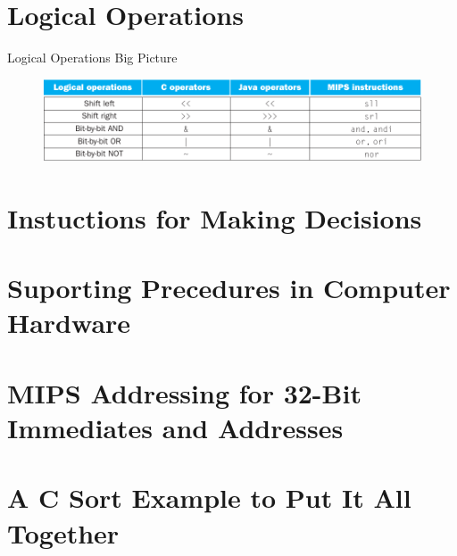 \section{Logical Operations}
\begin{frame}{Logical Operations Big Picture}
\begin{figure}
\begin{center}
\includegraphics[width=\textwidth, height=0.4\textheight]{docs/images/logical}
\end{center}
\end{figure}
\end{frame}
\section{Instuctions for Making Decisions}
\section{Suporting Precedures in Computer Hardware}
\section{MIPS Addressing for 32-Bit Immediates and Addresses}
\section{A C Sort Example to Put It All Together}